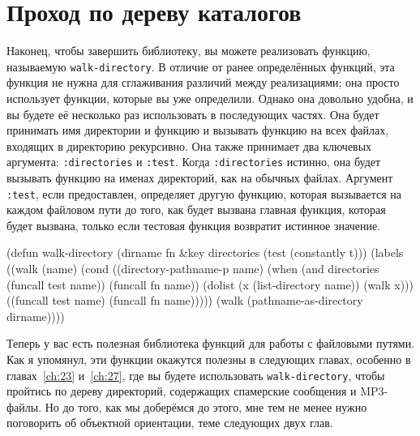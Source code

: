 \section{Проход по дереву каталогов}

Наконец, чтобы завершить библиотеку, вы можете реализовать функцию, называемую
\lstinline{walk-directory}. В отличие от ранее определённых функций, эта функция не нужна для
сглаживания различий между реализациями; она просто использует функции, которые вы уже
определили. Однако она довольно удобна, и вы будете её несколько раз использовать в
последующих частях. Она будет принимать имя директории и функцию и вызывать функцию на
всех файлах, входящих в директорию рекурсивно. Она также принимает два ключевых аргумента:
\lstinline{:directories} и \lstinline{:test}. Когда \lstinline{:directories} истинно, она будет вызывать
функцию на именах директорий, как на обычных файлах. Аргумент \lstinline{:test}, если
предоставлен, определяет другую функцию, которая вызывается на каждом файловом пути до
того, как будет вызвана главная функция, которая будет вызвана, только если тестовая
функция возвратит истинное значение.

\begin{myverb}
  (defun walk-directory (dirname fn &key directories (test (constantly t)))
    (labels
        ((walk (name)
           (cond
             ((directory-pathname-p name)
              (when (and directories (funcall test name))
                (funcall fn name))
              (dolist (x (list-directory name)) (walk x)))
             ((funcall test name) (funcall fn name)))))
      (walk (pathname-as-directory dirname))))
\end{myverb}

Теперь у вас есть полезная библиотека функций для работы с файловыми путями. Как я
упомянул, эти функции окажутся полезны в следующих главах, особенно в главах~\ref{ch:23}
и~\ref{ch:27}, где вы будете использовать \lstinline{walk-directory}, чтобы пройтись по
дереву директорий, содержащих спамерские сообщения и MP3-файлы. Но до того, как мы
доберёмся до этого, мне тем не менее нужно поговорить об объектной ориентации, теме
следующих двух глав.

